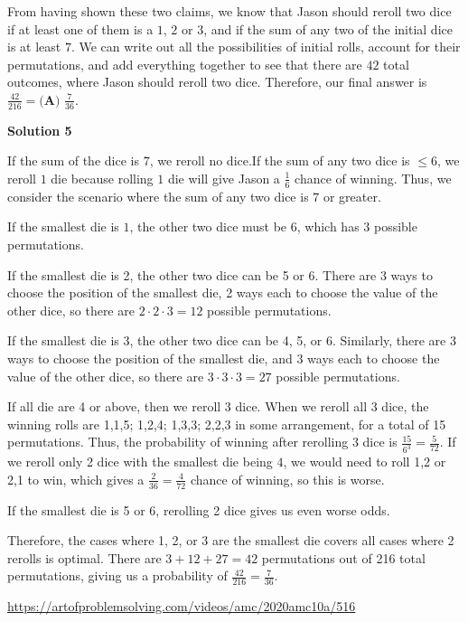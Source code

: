 \begin{enumerate}
 From having shown these two claims, we know that Jason should reroll two dice if at least one of them is a $1$, $2$ or $3$, and if the sum of any two of the initial dice is at least $7$. We can write out all the possibilities of initial rolls, account for their permutations, and add everything together to see that there are $42$ total outcomes, where Jason should reroll two dice. Therefore, our final answer is $\frac{42}{216} = \boxed{\textbf{(A) } \frac{7}{36}}$.

 



\textbf{Solution 5}

If the sum of the dice is $7$, we reroll no dice.If the sum of any two dice is $\leq 6$, we reroll $1$ die because rolling $1$ die will give Jason a $\frac{1}{6}$ chance of winning. Thus, we consider the scenario where the sum of any two dice is $7$ or greater. 

 
If the smallest die is $1$, the other two dice must be $6$, which has $3$ possible permutations.

 If the smallest die is 2, the other two dice can be 5 or 6. There are 3 ways to choose the position of the smallest die, 2 ways each to choose the value of the other dice, so there are $2 \cdot 2 \cdot 3 = 12$ possible permutations.

 If the smallest die is 3, the other two dice can be 4, 5, or 6. Similarly, there are 3 ways to choose the position of the smallest die, and 3 ways each to choose the value of the other dice, so there are $3 \cdot 3 \cdot 3 = 27$ possible permutations.

 If all die are 4 or above, then we reroll 3 dice. When we reroll all 3 dice, the winning rolls are 1,1,5; 1,2,4; 1,3,3; 2,2,3 in some arrangement, for a total of 15 permutations. Thus, the probability of winning after rerolling 3 dice is $\frac{15}{6^3} = \frac{5}{72}$. If we reroll only 2 dice with the smallest die being $4$, we would need to roll 1,2 or 2,1 to win, which gives a $\frac{2}{36} = \frac{4}{72}$ chance of winning, so this is worse.

 If the smallest die is 5 or 6, rerolling 2 dice gives us even worse odds.

 
Therefore, the cases where 1, 2, or 3 are the smallest die covers all cases where 2 rerolls is optimal. There are $3+12+27 = 42$ permutations out of 216 total permutations, giving us a probability of $\frac{42}{216} = \boxed{\frac{7}{36}}$.

 \href{https://artofproblemsolving.com/videos/amc/2020amc10a/516}{https://artofproblemsolving.com/videos/amc/2020amc10a/516}

 


\end{enumerate}